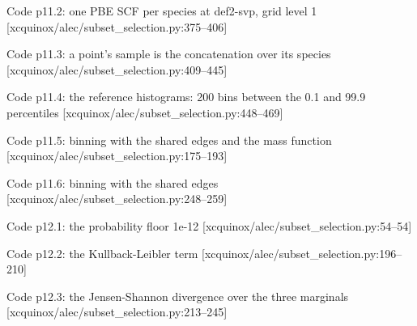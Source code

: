 \begin{frame}[allowframebreaks]{Code p11.2: one PBE SCF per species at def2-svp, grid level 1 [xcquinox/alec/subset\_selection.py:375--406]}
\label{code:p11_2_one_pbe_scf_per_species_at_def2_svp_grid}
\end{frame}
\begin{frame}[allowframebreaks]{Code p11.3: a point's sample is the concatenation over its species [xcquinox/alec/subset\_selection.py:409--445]}
\label{code:p11_3_a_point_s_sample_is_the_concatenation_ov}
\end{frame}
\begin{frame}[allowframebreaks]{Code p11.4: the reference histograms: 200 bins between the 0.1 and 99.9 percentiles [xcquinox/alec/subset\_selection.py:448--469]}
\label{code:p11_4_the_reference_histograms_200_bins_betwee}
\end{frame}
\begin{frame}[allowframebreaks]{Code p11.5: binning with the shared edges and the mass function [xcquinox/alec/subset\_selection.py:175--193]}
\label{code:p11_5_binning_with_the_shared_edges_and_the_ma}
\end{frame}
\begin{frame}[allowframebreaks]{Code p11.6: binning with the shared edges [xcquinox/alec/subset\_selection.py:248--259]}
\label{code:p11_6_binning_with_the_shared_edges}
\end{frame}
\begin{frame}[allowframebreaks]{Code p12.1: the probability floor 1e-12 [xcquinox/alec/subset\_selection.py:54--54]}
\label{code:p12_1_the_probability_floor_1e_12}
\end{frame}
\begin{frame}[allowframebreaks]{Code p12.2: the Kullback-Leibler term [xcquinox/alec/subset\_selection.py:196--210]}
\label{code:p12_2_the_kullback_leibler_term}
\end{frame}
\begin{frame}[allowframebreaks]{Code p12.3: the Jensen-Shannon divergence over the three marginals [xcquinox/alec/subset\_selection.py:213--245]}
\label{code:p12_3_the_jensen_shannon_divergence_over_the_t}
\end{frame}
